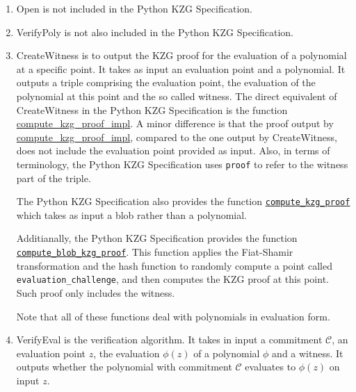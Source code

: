 \documentclass[12pt]{galois-whitepaper}
\begin{document}
\begin{enumerate}
\begin{enumerate}
    \item \textsf{Open} is not included in the Python KZG Specification.
    
    \item \textsf{VerifyPoly} is not also included in the Python KZG Specification.
    
    \item \textsf{CreateWitness} is to output the KZG proof for the evaluation of a polynomial at a specific point.
    It takes as input an evaluation point and a polynomial.
    It outputs a triple comprising the evaluation point, the evaluation of the polynomial at this point and the so called witness. 
    The direct equivalent of  \textsf{CreateWitness} in the Python KZG Specification is the function  \href{https://github.com/ethereum/consensus-specs/blob/dev/specs/deneb/polynomial-commitments.md\#compute_kzg_proof_impl}{compute\_kzg\_proof\_impl}.
    A minor difference is that the proof output by \href{https://github.com/ethereum/consensus-specs/blob/dev/specs/deneb/polynomial-commitments.md\#compute_kzg_proof_impl}{compute\_kzg\_proof\_impl}, compared to the one output by \textsf{CreateWitness}, does not include the evaluation point provided as input.
    Also, in terms of terminology, the Python KZG Specification uses \texttt{proof} to refer to the witness part of the triple.

    The Python KZG Specification also provides the function \href{https://github.com/ethereum/consensus-specs/blob/dev/specs/deneb/polynomial-commitments.md\#compute_kzg_proof}{\texttt{compute\_kzg\_proof}} which takes as input a blob rather than a polynomial.
    
    Additianally, the Python KZG Specification provides the function
    \href{https://github.com/ethereum/consensus-specs/blob/dev/specs/deneb/polynomial-commitments.md\#compute_blob_kzg_proof}{\texttt{compute\_blob\_kzg\_proof}}.
    This function applies the Fiat-Shamir transformation and the hash function to randomly compute a point called \texttt{evaluation\_challenge}, and then computes the KZG proof at this point.
    Such proof only includes the witness.

    Note that all of these functions deal with polynomials in evaluation form.
    
    \item \textsf{VerifyEval} is the verification algorithm.
    It takes in input a commitment $\mathcal{C}$, an evaluation point $z$, the evaluation $\phi(z)$ of a polynomial $\phi$ and a witness.
    It outputs whether the polynomial with commitment $\mathcal{C}$ evaluates to $\phi(z)$ on input $z$.


\end{enumerate}
\end{enumerate}
\end{document}
